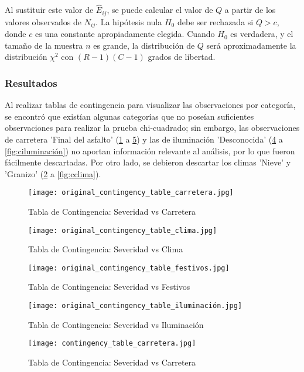 \documentclass{book}
\begin{document}
Al sustituir este valor de $\hat{E}_{ij}$, se puede calcular el valor de $Q$ a partir de los valores observados de $N_{ij}$. La hipótesis nula $H_0$ debe ser rechazada si $Q > c$, donde $c$ es una constante apropiadamente elegida. Cuando $H_0$ es verdadera, y el tamaño de la muestra $n$ es grande, la distribución de $Q$ será aproximadamente la distribución $\chi^2$ con $(R - 1)(C - 1)$ grados de libertad.

\subsubsection{Resultados}
Al realizar tablas de contingencia para visualizar las observaciones por categoría, se encontró que existían algunas categorías que no poseían suficientes observaciones para realizar la prueba chi-cuadrado; sin embargo, las observaciones de carretera 'Final del asfalto' (\ref{fig:occarretera} a \ref{fig:ccarretera}) y las de iluminación 'Desconocida' (\ref{fig:ociluminación} a \ref{fig:ciluminación}) no aportan información relevante al análisis, por lo que fueron fácilmente descartadas. Por otro lado, se debieron descartar los climas 'Nieve' y 'Granizo' (\ref{fig:occlima} a \ref{fig:cclima}).
\begin{figure}[htbp]
\centering
\texttt{[image: original\_contingency\_table\_carretera.jpg]}
\caption{\label{fig:occarretera}Tabla de Contingencia: Severidad vs Carretera}
\end{figure}
\begin{figure}[htbp]
\centering
\texttt{[image: original\_contingency\_table\_clima.jpg]}
\caption{\label{fig:occlima}Tabla de Contingencia: Severidad vs Clima}
\end{figure}
\begin{figure}[htbp]
\centering
\texttt{[image: original\_contingency\_table\_festivos.jpg]}
\caption{\label{fig:ocfestivos}Tabla de Contingencia: Severidad vs Festivos}
\end{figure}
\begin{figure}[htbp]
\centering
\texttt{[image: original\_contingency\_table\_iluminación.jpg]}
\caption{\label{fig:ociluminación}Tabla de Contingencia: Severidad vs Iluminación}
\end{figure}
\begin{figure}[htbp]
\centering
\texttt{[image: contingency\_table\_carretera.jpg]}
\caption{\label{fig:ccarretera}Tabla de Contingencia: Severidad vs Carretera}
\end{figure}
\end{document}
